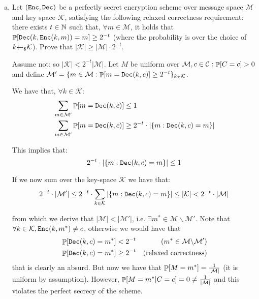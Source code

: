 \begin{enumerate}[(a)]
\begin{solution}
	\end{solution}
	
	\item Let $(\enc, \dec)$ be a perfectly secret encryption scheme over message space $\mathcal{M}$ and key space $\mathcal{K}$, satisfying the following relaxed correctness requirement: there exists $t \in \N$ such that, $\forall m \in \mathcal{M}$, it holds that $\P[\dec(k, \enc(k, m)) = m] \ge 2^{-t}$ (where the probability is over the choice of $k \ud \mathcal{K}$). Prove that $|\mathcal{K}| \ge |\mathcal{M}| \cdot 2^{-t}$.
	
	\begin{solution}
		Assume not: so $|\mathcal{K}| < 2^{-t}|\mathcal{M}|$.
		Let $M$ be uniform over $\mathcal{M}, c \in \mathcal{C}: \P[C=c] > 0$ and define $\mathcal{M}' = \{ m \in \mathcal{M}: \P[m = \dec(k,c)] \ge 2^{-t}\}_{k \in \mathcal{K}}$.
		
		We have that, $\forall k \in \mathcal{K}$:
		\begin{align}
			&\sum_{m \in \mathcal{M}'} \P[m=\dec(k, c)] \le 1 \\
			&\sum_{m \in \mathcal{M}'} \P[m=\dec(k, c)] \ge 2^{-t} \cdot |\{m: \dec(k, c) = m\}|
		\end{align}
		
		This implies that:
		\[ 2^{-t} \cdot |\{m: \dec(k, c) = m\}| \le 1 \]
		
		If we now sum over the key-space $\mathcal{K}$ we have that:
		\[2^{-t}\cdot |\mathcal{M}'| \le 2^{-t}\cdot \sum_{k \in \mathcal{K}} |\{m: \dec(k, c) = m\}| \le |\mathcal{K}| < 2^{-t}\cdot |\mathcal{M}| \]

		from which we derive that $|\mathcal{M}| < |\mathcal{M}'|$, i.e. $\exists m^* \in \mathcal{M} \backslash \mathcal{M}'$.
		Note that $\forall k \in \mathcal{K}, \enc(k, m^*)\ne c$, otherwise we would have that
		\begin{align}
			&\P[\dec(k, c) = m^*] < 2^{-t} &(m^* \in  \mathcal{M} \backslash \mathcal{M}') \\
			&\P[\dec(k, c) = m^*] \ge 2^{-t} &(\mbox{relaxed correctness})
		\end{align}
		that is clearly an absurd. But now we have that $\P[M=m^*] = \frac{1}{|\mathcal{M}|}$ (it is uniform by assumption). However, $\P[M=m^*|C=c] = 0 \ne \frac{1}{|\mathcal{M}|}$ and this violates the perfect secrecy of the scheme.
	\end{solution}
\end{enumerate}